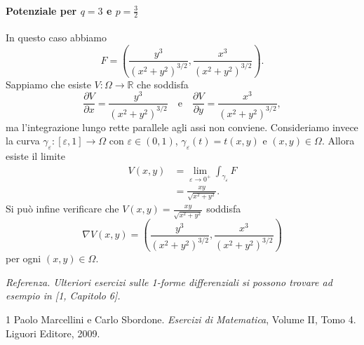 \begin{enumerate}
		\paragraph{Potenziale per $q = 3$ e $p = \frac{3}{2}$}
		In questo caso abbiamo
		\[
		F = \left(\frac{y^3}{(x^2 + y^2)^{3/2}}, \frac{x^3}{(x^2 + y^2)^{3/2}}\right).
		\]
		Sappiamo che esiste $V: \Omega \to \mathbb{R}$ che soddisfa
		\[
		\frac{\partial V}{\partial x} = \frac{y^3}{(x^2 + y^2)^{3/2}} \quad \text{e} \quad \frac{\partial V}{\partial y} = \frac{x^3}{(x^2 + y^2)^{3/2}},
		\]
		ma l'integrazione lungo rette parallele agli assi non conviene. Consideriamo invece la curva $\gamma_{\varepsilon}: [\varepsilon,1] \to \Omega$ con $\varepsilon \in (0,1)$, $\gamma_{\varepsilon}(t) = t(x,y)$ e $(x,y) \in \Omega$. Allora esiste il limite
		\[
		\begin{aligned}
			V(x,y) &= \lim_{\varepsilon \to 0^+} \int_{\gamma_{\varepsilon}} F \\
			&= \frac{xy}{\sqrt{x^2 + y^2}}.
		\end{aligned}
		\]
		Si può infine verificare che $V(x,y) = \frac{xy}{\sqrt{x^2 + y^2}}$ soddisfa
		\[
		\nabla V(x,y) = \left(\frac{y^3}{(x^2 + y^2)^{3/2}}, \frac{x^3}{(x^2 + y^2)^{3/2}}\right)
		\]
		per ogni $(x,y) \in \Omega$.

\end{enumerate}

\textit{Referenza. Ulteriori esercizi sulle 1-forme differenziali si possono trovare ad esempio in [1, Capitolo 6].}

\begin{thebibliography}{1}
	 Paolo Marcellini e Carlo Sbordone. \textit{Esercizi di Matematica}, Volume II, Tomo 4. Liguori Editore, 2009.
\end{thebibliography}
